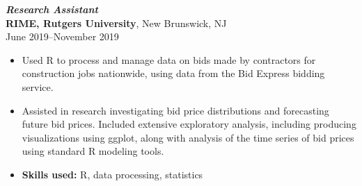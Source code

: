 \documentclass[letterpaper,12pt]{article}
\begin{document}
\textit{\textbf{Research Assistant}} \\
\textbf{RIME, Rutgers University}, New Brunswick, NJ \\
June 2019--November 2019
\begin{itemize}
  \item Used R to process and manage data on bids made by contractors for
        construction jobs nationwide, using data from the Bid Express bidding
        service.
  \item Assisted in research investigating bid price distributions and
        forecasting future bid prices. Included extensive exploratory analysis,
        including producing visualizations using ggplot, along with analysis of
        the time series of bid prices using standard R modeling tools.
  \item \textbf{Skills used:} R, data processing, statistics
\end{itemize}

\iffalse
  \textit{\textbf{Research Assistant}} \\
  \textbf{Alan M. Voorhees Transportation Center, Bloustein School of Planning
    and Public Policy, Rutgers University}, New Brunswick, NJ \\
  June 2018--July 2018
  \begin{itemize}
    \item Used R and the Elsevier Scopus API to scrape roughly two-decades worth
          of abstracts from articles published in transportation-related
          journals. The goal was to determine whether writing quality in these
          journals has degraded or improved with time.
    \item The scraped data was cleaned using R and fed into the Coh-Metrix
          system, developed at the University of Memphis to analyze linguistic
          cohesion among a collection of text corpora.
    \item No conclusive results from this brief study, but open to further
          investigation.
    \item \textbf{Skills used:} R, data processing
  \end{itemize}
\fi
\end{document}
